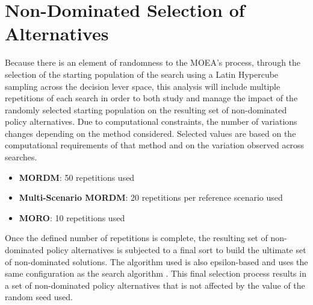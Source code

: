 \section{Non-Dominated Selection of Alternatives} \label{step2-pareto}
Because there is an element of randomness to the MOEA's process, through the selection of the starting population of the search using a Latin Hypercube sampling across the decision lever space, this analysis will include multiple repetitions of each search in order to both study and manage the impact of the randomly selected starting population on the resulting set of non-dominated policy alternatives. Due to computational constraints, the number of variations changes depending on the method considered. Selected values are based on the computational requirements of that method and on the variation observed across searches. 

\begin{itemize}
    \item \textbf{MORDM}: 50 repetitions used
    \item \textbf{Multi-Scenario MORDM}: 20 repetitions per reference scenario used
    \item \textbf{MORO}: 10 repetitions used
\end{itemize}

Once the defined number of repetitions is complete, the resulting set of non-dominated policy alternatives is subjected to a final sort to build the ultimate set of non-dominated solutions. The algorithm used is also epsilon-based and uses the same configuration as the search algorithm \citep{Deb2002, Deb2005, Woodruff2013}. This final selection process results in a set of non-dominated policy alternatives that is not affected by the value of the random seed used. 